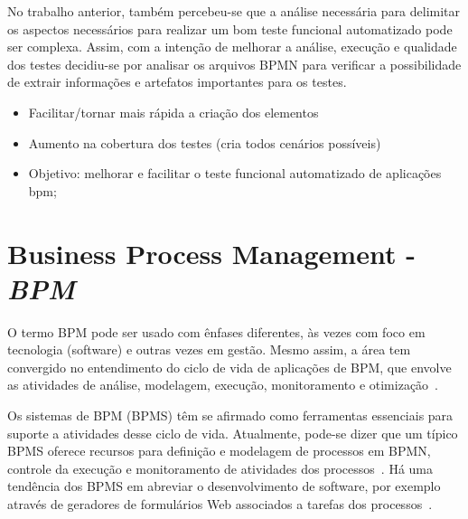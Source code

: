\documentclass[12pt]{article}
\begin{document}
No trabalho anterior, também percebeu-se que a análise necessária para delimitar os aspectos necessários para realizar um bom teste funcional automatizado pode ser complexa. Assim, com a intenção de melhorar a análise, execução e qualidade dos testes decidiu-se por analisar os arquivos BPMN para verificar a possibilidade de extrair informações  e artefatos importantes para os testes.


 \begin{itemize}
	\item Facilitar/tornar mais rápida a criação dos elementos
	\item Aumento na cobertura dos testes (cria todos cenários possíveis)
   \item Objetivo:  melhorar e facilitar o teste funcional automatizado de aplicações bpm;
\end{itemize}
 

\section{Business Process Management - \emph{BPM}}

O termo BPM pode ser usado com ênfases diferentes, às vezes com foco em tecnologia (software) e outras vezes em gestão. Mesmo assim, a área tem convergido no entendimento do ciclo de vida de aplicações de BPM, que envolve as atividades de análise, modelagem, execução, monitoramento e otimização~\cite{ABPMP}. 

Os sistemas de BPM (BPMS) têm se afirmado como ferramentas essenciais para suporte a atividades desse ciclo de vida. Atualmente, pode-se dizer que um típico BPMS oferece recursos para definição e modelagem de processos em BPMN, controle da execução e monitoramento de atividades dos processos~\cite{forrester}. Há uma tendência dos BPMS em abreviar o desenvolvimento de software, por exemplo através de geradores de formulários Web associados a tarefas dos processos~\cite{greenresearch}. 
\end{document}
